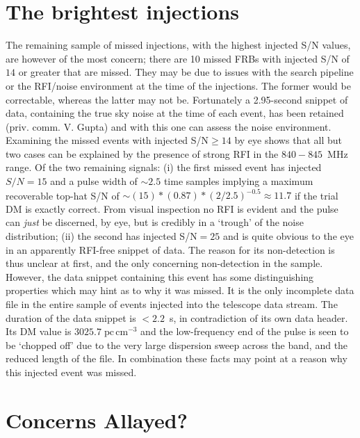 \documentclass[RNAAS]{aastex62}
\begin{document}
\section{The brightest injections}

The remaining sample of missed injections, with the highest injected S/N values, are however of the most concern; there are 10 missed FRBs with injected S/N of $14$ or greater that are missed. They may be due to issues with the search pipeline or the RFI/noise environment at the time of the injections. The former would be correctable, whereas the latter may not be. Fortunately a 2.95-second snippet of data, containing the true sky noise at the time of each event, has been retained (priv. comm. V. Gupta) and with this one can assess the noise environment. Examining the missed events with injected S/N$\geq 14$ by eye shows that all but two cases can be explained by the presence of strong RFI in the $840-845$~MHz range. Of the two remaining signals: (i) the first missed event has injected $S/N=15$ and a pulse width of $\sim 2.5$ time samples implying a maximum recoverable top-hat S/N of $\sim(15)*(0.87)*(2/2.5)^{-0.5}\approx 11.7$ if the trial DM is exactly correct. From visual inspection no RFI is evident and the pulse can \textit{just} be discerned, by eye, but is credibly in a `trough' of the noise distribution; (ii) the second has injected S/N$=25$ and is quite obvious to the eye in an apparently RFI-free snippet of data. The reason for its non-detection is thus unclear at first, and the only concerning non-detection in the sample. However, the data snippet containing this event has some distinguishing properties which may hint as to why it was missed. It is the only incomplete data file in the entire sample of events injected into the telescope data stream. The duration of the data snippet is $<2.2$~s, in contradiction of its own data header. Its DM value is $3025.7\;\mathrm{pc}\,\mathrm{cm}^{-3}$ and the low-frequency end of the pulse is seen to be `chopped off' due to the very large dispersion sweep across the band, and the reduced length of the file. In combination these facts may point at a reason why this injected event was missed. 

\section{Concerns Allayed?}
\end{document}
